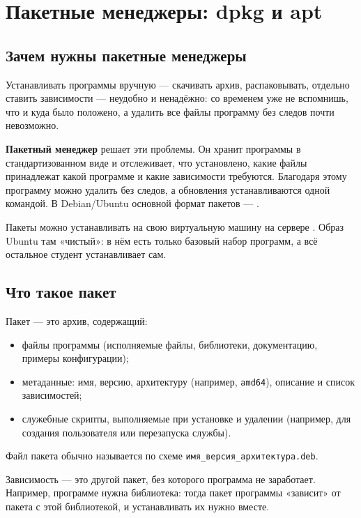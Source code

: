 \chapter{Пакетные менеджеры: dpkg и apt}
\label{ch:08-packages}

\section{Зачем нужны пакетные менеджеры}

Устанавливать программы вручную — скачивать архив, распаковывать,
отдельно ставить зависимости — неудобно и ненадёжно: со временем
уже не вспомнишь, что и куда было положено, а удалить все файлы программу
без следов почти невозможно.

\textbf{Пакетный менеджер} решает эти проблемы. Он хранит программы
в стандартизованном виде и отслеживает, что установлено, какие
файлы принадлежат какой программе и какие зависимости требуются.
Благодаря этому программу можно удалить без следов, а обновления
устанавливаются одной командой. В Debian/Ubuntu основной
формат пакетов --- \textbf{}.

Пакеты можно устанавливать на свою виртуальную машину на сервере
. Образ Ubuntu там «чистый»: в нём есть только
базовый набор программ, а всё остальное студент устанавливает сам.

\section{Что такое пакет}

Пакет --- это архив, содержащий:
\begin{itemize}
  \item файлы программы (исполняемые файлы, библиотеки, документацию,
    примеры конфигурации);
  \item метаданные: имя, версию, архитектуру (например, \texttt{amd64}),
    описание и список зависимостей;
  \item служебные скрипты, выполняемые при установке и удалении
    (например, для создания пользователя или перезапуска службы).
\end{itemize}

Файл пакета обычно называется по схеме
\texttt{имя\_версия\_архитектура.deb}.

Зависимость --- это другой пакет, без которого программа не
заработает. Например, программе нужна библиотека: тогда пакет
программы «зависит» от пакета с этой библиотекой, и устанавливать их
нужно вместе.

